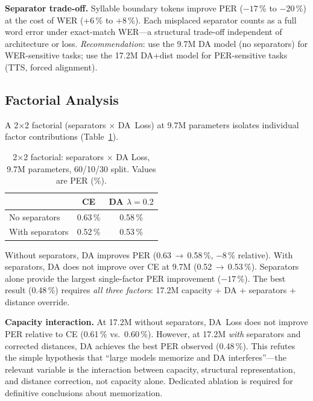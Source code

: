 \documentclass[conference]{IEEEtran}
\newcommand{\lam}{\lambda}                %
\begin{document}
\textbf{Separator trade-off.}
Syllable boundary tokens improve PER ($-17$\,\% to $-20$\,\%) at
the cost of WER ($+6$\,\% to $+8$\,\%).
Each misplaced separator counts as a full word error under
exact-match WER---a structural trade-off independent of architecture
or loss.
\textit{Recommendation}: use the 9.7M DA model (no separators)
for WER-sensitive tasks; use the 17.2M DA+dist model for
PER-sensitive tasks (TTS, forced alignment).

\subsection{Factorial Analysis}
\label{sec:factorial}

A 2$\times$2 factorial (separators $\times$ DA~Loss) at 9.7M
parameters isolates individual factor contributions
(Table~\ref{tab:factorial}).

\begin{table}[t]
  \caption{2$\times$2 factorial: separators $\times$ DA Loss,
           9.7M parameters, 60/10/30 split. Values are PER (\%).}
  \label{tab:factorial}
  \centering\small
  \begin{tabular}{lcc}
    \toprule
    & CE & DA $\lam\!=\!0.2$ \\
    \midrule
    No separators   & 0.63\,\% & 0.58\,\% \\
    With separators & 0.52\,\% & 0.53\,\% \\
    \bottomrule
  \end{tabular}
\end{table}

Without separators, DA improves PER (0.63\,$\to$\,0.58\,\%,
$-8$\,\% relative).
With separators, DA does not improve over CE at 9.7M
(0.52\,$\to$\,0.53\,\%).
Separators alone provide the largest single-factor PER improvement
($-17$\,\%).
The best result (0.48\,\%) requires \emph{all three factors}:
17.2M capacity + DA + separators + distance override.

\textbf{Capacity interaction.}
At 17.2M without separators, DA~Loss does not improve PER relative
to CE (0.61\,\% vs.\ 0.60\,\%).
However, at 17.2M \emph{with} separators and corrected distances,
DA achieves the best PER observed (0.48\,\%).
This refutes the simple hypothesis that ``large models memorize and
DA interferes''---the relevant variable is the interaction between
capacity, structural representation, and distance correction, not
capacity alone.
Dedicated ablation is required for definitive conclusions about
memorization.
\end{document}
